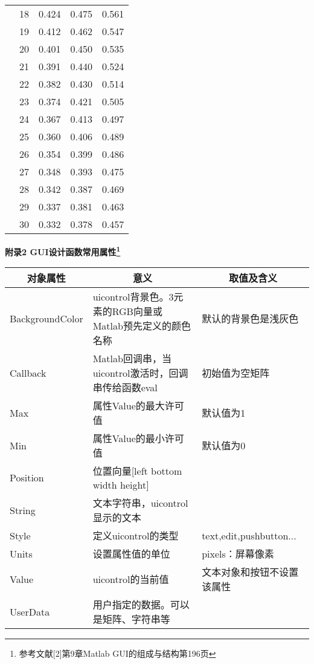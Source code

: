 \begin{tabular}{|p{4cm}<{\centering}|p{2cm}<{\centering}|p{2cm}<{\centering}|p{2cm}<{\centering}|p{2cm}<{\centering}|}
	&18	&0.424	&0.475	&0.561	\\	\cline{2-5}
	&19	&0.412	&0.462	&0.547	\\	\cline{2-5}
	&20	&0.401	&0.450	&0.535	\\	\cline{2-5}
	&21	&0.391	&0.440	&0.524	\\	\cline{2-5}
	&22	&0.382	&0.430	&0.514	\\	\cline{2-5}
	&23	&0.374	&0.421	&0.505	\\	\cline{2-5}
	&24	&0.367	&0.413	&0.497	\\	\cline{2-5}
	&25	&0.360	&0.406	&0.489	\\	\cline{2-5}
	&26	&0.354	&0.399	&0.486	\\	\cline{2-5}
	&27	&0.348	&0.393	&0.475	\\	\cline{2-5}
	&28	&0.342	&0.387	&0.469	\\	\cline{2-5}
	&29	&0.337	&0.381	&0.463	\\	\cline{2-5}
	&30	&0.332	&0.378	&0.457	\\	\hline
\end{tabular}
\newpage
\begin{center}
	\textbf{附录2 GUI设计函数常用属性\footnote{参考文献[2]第9章Matlab GUI的组成与结构第196页}}
\end{center}
\begin{tabular}{|p{3cm}|p{5cm}|p{5cm}|}
	\hline
	\multicolumn{1}{|c|}{\textbf{对象属性}}	&\multicolumn{1}{c}{\textbf{意义}}	&\multicolumn{1}{|c|}{\textbf{取值及含义}}\\	\hline
	BackgroundColor	&uicontrol背景色。3元素的RGB向量或Matlab预先定义的颜色名称	&默认的背景色是浅灰色		\\	\hline
	Callback		&Matlab回调串，当uicontrol激活时，回调串传给函数eval	   &初始值为空矩阵			\\	\hline
	Max				&属性Value的最大许可值									 &默认值为1				\\	\hline
	Min				&属性Value的最小许可值									 &默认值为0				\\	\hline
	Position		&位置向量[left bottom width height]					   	&					    \\	\hline
	String			&文本字符串，uicontrol显示的文本						    &					 \\	\hline
	Style			&定义uicontrol的类型					&text,edit,pushbutton...				\\	\hline
	Units			&设置属性值的单位										&pixels：屏幕像素		\\	\hline
	Value			&uicontrol的当前值										&文本对象和按钮不设置该属性	\\	\hline
	UserData		&用户指定的数据。可以是矩阵、字符串等						&						\\	\hline
\end{tabular}
